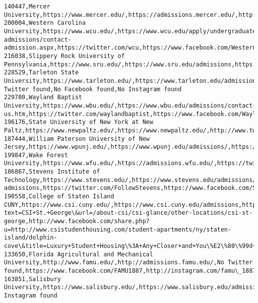 \documentclass[11pt]{article}
\begin{document}
\begin{Verbatim}[commandchars=\\\{\}]
140447,Mercer University,https://www.mercer.edu/,https://admissions.mercer.edu/,http://twitter.com/MercerYou/,http://www.facebook.com/MercerUniversity/,https://www.instagram.com/p/BpXZwhAHERO/
200004,Western Carolina University,https://www.wcu.edu/,https://www.wcu.edu/apply/undergraduate-admissions/contact-admission.aspx,https://twitter.com/wcu,https://www.facebook.com/WesternCarolinaUniversity/,https://www.instagram.com/western\_carolina/
216038,Slippery Rock University of Pennsylvania,https://www.sru.edu/,https://www.sru.edu/admissions,https://www.twitter.com/sruofpa,https://www.facebook.com/slipperyrockuniversity,http://instagram.com/slipperyrockuniversity/
228529,Tarleton State University,https://www.tarleton.edu/,https://www.tarleton.edu/admissions/index.html,No Twitter found,No Facebook found,No Instagram found
229780,Wayland Baptist University,https://www.wbu.edu/,https://www.wbu.edu/admissions/contact-us.htm,https://twitter.com/waylandbaptist,https://www.facebook.com/WaylandBaptistUniversity,https://www.instagram.com/p/Bpc2YgaHrfm/
196176,State University of New York at New Paltz,https://www.newpaltz.edu/,https://www.newpaltz.edu/,http://www.twitter.com/newpaltz,http://www.facebook.com/newpaltz,http://instagram.com/sunynewpaltz
187444,William Paterson University of New Jersey,https://www.wpunj.edu/,https://www.wpunj.edu/admissions/,https://twitter.com/WPUNJ\_EDU,https://www.facebook.com/mywpu,http://instagram.com/wpunj
199847,Wake Forest University,https://www.wfu.edu/,https://admissions.wfu.edu/,https://twitter.com/WakeForest,https://www.facebook.com/wfuniversity,https://www.instagram.com/wfuniversity/
186867,Stevens Institute of Technology,https://www.stevens.edu/,https://www.stevens.edu/admissions/undergraduate-admissions,https://twitter.com/FollowStevens,https://www.facebook.com/Stevens1870,https://www.instagram.com/p/BoDNaVBFxRo
190558,College of Staten Island CUNY,https://www.csi.cuny.edu/,https://www.csi.cuny.edu/admissions,http://twitter.com/share?text=CSI+St.+George\&url=/about-csi/csi-glance/other-locations/csi-st-george,http://www.facebook.com/share.php?u=http://www.csistudenthousing.com/student-apartments/ny/staten-island/dolphin-cove\&title=Luxury+Student+Housing\%3A+Any+Closer+and+You\%E2\%80\%99d+be+in+Class,https://www.instagram.com/collegeofstatenisland/
133650,Florida Agricultural and Mechanical University,http://www.famu.edu/,http://admissions.famu.edu/,No Twitter found,https://www.facebook.com/FAMU1887,http://instagram.com/famu\_1887
163851,Salisbury University,https://www.salisbury.edu/,https://www.salisbury.edu/admissions/,https://www.twitter.com/salisburyu,https://www.facebook.com/SalisburyU/,No Instagram found

\end{Verbatim}
\end{document}
